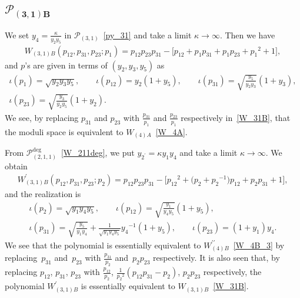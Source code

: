 \documentclass[pdftex]{sigma}
\numberwithin{equation}{section}
\begin{document}
\subsection[$\mathcal{P}_{(3,1)B}$]{$\boldsymbol{\mathcal{P}_{(3,1)B}}$}
We set $y_4=\frac{\kappa}{y_2 y_5}$ in $\mathcal{P}_{(3,1)}$~\eqref{py_31} and take a limit $\kappa\to\infty$. Then we have
\begin{gather} \label{W_31B}
 W_{(3,1)B}(p_{12}, p_{31}, p_{23} ; p_1 ) = p_{12} p_{23} p_{31} - \big[ p_{12} + p_1 p_{31} + p_1 p_{23} + {p_1}^2+ 1 \big],
\end{gather}
and $p$'s are given in terms of $(y_2, y_3, y_5)$ as
\begin{gather*}
 \iota(p_1) = \sqrt{y_2 y_3 y_5} , \qquad \iota(p_{12}) = y_2 ( 1 + y_5) ,\qquad \iota(p_{31}) = \sqrt{\frac{y_5}{y_2 y_3}} ( 1 + y_3) , \\
\iota(p_{23}) = \sqrt{\frac{y_3}{y_2 y_5}} ( 1 + y_2) .
\end{gather*}
We see, by replacing $p_{31}$ and $p_{23}$ with $\frac{p_{31}}{p_1}$ and $\frac{p_{23}}{p_1}$ respectively in~\eqref{W_31B}, that the moduli space is equivalent to $W_{(4)A}$~\eqref{W_4A}.

From $\mathcal{P}_{(2,1,1)}^{\text{deg}}$~\eqref{W_211deg}, we put $y_{2^\prime} = \kappa y_1 y_4$ and take a limit $\kappa\to\infty$. We obtain
\begin{gather*}%
 W^\prime_{(3,1)B}(p_{12}, p_{31}, p_{23}; p_2) = p_{12} p_{23} p_{31} - \big[ {p_{12}}^2 + \big(p_2 + {p_2}^{-1} \big) p_{12} + p_2 p_{31} + 1 \big],
\end{gather*}
and the realization is
\begin{gather*}
 \iota(p_2) = \sqrt{ y_1 y_4 y_5},\qquad \iota(p_{12}) = \sqrt{\frac{y_1}{y_4 y_5}} ( 1+y_5) , \\
\iota(p_{31}) = \sqrt{\frac{y_5}{y_1 y_4}} + \frac{1}{\sqrt{y_1 y_4 y_5}} {y_4}^{-1} ( 1 + y_5 ) , \qquad \iota(p_{23}) = ( 1 + y_1 ) y_4 .
\end{gather*}
We see that the polynomial is essentially equivalent to $W^{\prime\prime}_{(4)B}$~\eqref{W_4B_3} by replacing~$p_{31}$ and~$p_{23}$ with $\frac{p_{31}}{p_2}$ and~$p_2 p_{23}$ respectively. It is also seen that, by replacing $p_{12}$, $p_{31}$, $p_{23}$ with $\frac{p_{12}}{p_2}$, $\frac{1}{{p_2}^2} ( p_{12} p_{31} - p_2)$, $p_2 p_{23}$ respectively, the polynomial $W^\prime_{(3,1)B}$ is essentially equivalent to $W_{(3,1)B}$~\eqref{W_31B}.
\end{document}
